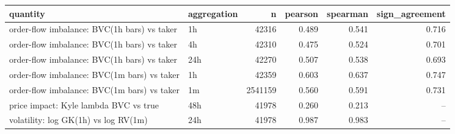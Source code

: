 \begin{tabular}{llrrrr}
\toprule
quantity & aggregation & n & pearson & spearman & sign_agreement \\
\midrule
order-flow imbalance: BVC(1h bars) vs taker & 1h & 42316 & 0.489 & 0.541 & 0.716 \\
order-flow imbalance: BVC(1h bars) vs taker & 4h & 42310 & 0.475 & 0.524 & 0.701 \\
order-flow imbalance: BVC(1h bars) vs taker & 24h & 42270 & 0.507 & 0.538 & 0.693 \\
order-flow imbalance: BVC(1m bars) vs taker & 1h & 42359 & 0.603 & 0.637 & 0.747 \\
order-flow imbalance: BVC(1m bars) vs taker & 1m & 2541159 & 0.560 & 0.591 & 0.731 \\
price impact: Kyle lambda BVC vs true & 48h & 41978 & 0.260 & 0.213 & -- \\
volatility: log GK(1h) vs log RV(1m) & 24h & 41978 & 0.987 & 0.983 & -- \\
\bottomrule
\end{tabular}
